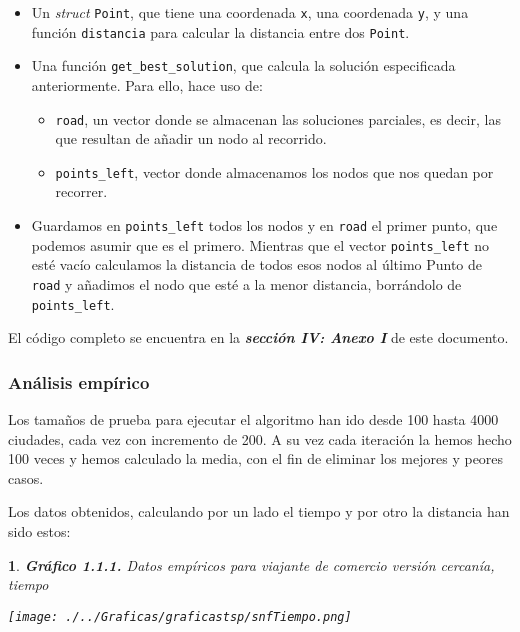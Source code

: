 \documentclass[10pt, a4paper]{article}
\theoremstyle{theorem-style}
\newtheorem*{datos}{}
\theoremstyle{theorem-style}
\theoremstyle{definition-style}
\theoremstyle{remark-style}
\theoremstyle{example-style}
\theoremstyle{definition-style}
\theoremstyle{remark-style}
\begin{document}
\begin{itemize}
	\item Un \emph{struct} \texttt{Point}, que tiene una coordenada \texttt{x}, una coordenada \texttt{y}, y una función \texttt{distancia} para calcular la distancia entre dos \texttt{Point}.
	\item Una función \texttt{get\_best\_solution}, que calcula la solución especificada anteriormente. Para ello, hace uso de:
	\begin{itemize}
		\item \texttt{road}, un vector donde se almacenan las soluciones parciales, es decir, las que resultan de añadir un nodo al recorrido.
		\item \texttt{points\_left}, vector donde almacenamos los nodos que nos quedan por recorrer.
	\end{itemize}
	\item[] Guardamos en \texttt{points\_left} todos los nodos y en \texttt{road} el primer punto, que podemos asumir que es el primero. 
Mientras que el vector \texttt{points\_left} no esté vacío calculamos la distancia de todos esos nodos al último Punto de \texttt{road} y añadimos el nodo que esté a la menor distancia, borrándolo de \texttt{points\_left}.
\end{itemize}
El código completo se encuentra en la \textbf{\emph{sección IV: Anexo I}} de este documento.

\subsubsection*{Análisis empírico}

Los tamaños de prueba para ejecutar el algoritmo han ido desde 100 hasta 4000 ciudades, cada vez con incremento de 200. A su vez cada iteración la hemos hecho 100 veces y hemos calculado la media, con el fin de eliminar los mejores y peores casos.

\pagebreak

Los datos obtenidos, calculando por un lado el tiempo y por otro la distancia han sido estos:

\begin{datos}
	{\bf\sffamily Gráfico 1.1.1.} {\sffamily Datos empíricos para viajante de comercio versión cercanía, tiempo}\\
	\vspace{-0.7cm}
	\begin{center}
		\texttt{[image: ./../Graficas/graficastsp/snfTiempo.png]}
	\end{center}	
\end{datos}
\end{document}
